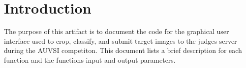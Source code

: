 \documentclass[]{article}
\newcounter{includepdfpage}
\newcommand{\pdflink}[2]{
\hyperlink{#1.1}{\textbf{#2}}
}
\newcommand{\pdflinkdoc}[2]{

}
\begin{document}



\section{Introduction}

The purpose of this artifact is to document the code for the graphical user interface used to crop, classify, and 
submit target images to the judges server during the AUVSI competiton. This document lists a brief description for 
each function and the functions input and output parameters.




\pdflinkdoc{api_doc}{./api/api.pdf}
\end{document}
